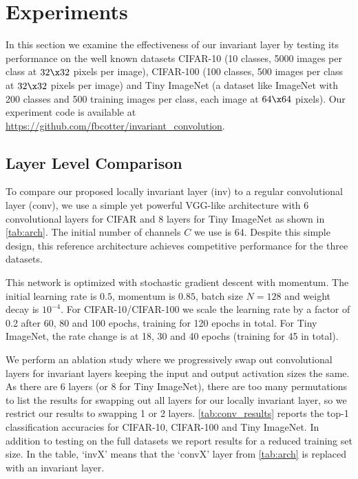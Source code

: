 \section{Experiments}\label{sec:experiments}
In this section we examine the effectiveness of our invariant layer by testing
its performance on the well known datasets CIFAR-10 (10 classes, 5000 images per class
at $32\x 32$ pixels per image), CIFAR-100 (100 classes, 500 images per class at 
$32\x 32$ pixels per image) and Tiny ImageNet\cite{li_tiny_nodate} (a dataset
like ImageNet with 200 classes and 500 training images per class, each image at
$64 \x 64$ pixels). Our experiment code is available at
\url{https://github.com/fbcotter/invariant_convolution}.

\subsection{Layer Level Comparison}\label{sec:conv_exp}
To compare our proposed locally invariant layer (inv) to a regular convolutional
layer (conv), we use a simple yet powerful VGG-like architecture with 6 convolutional layers for CIFAR
and 8 layers for Tiny ImageNet as shown in \autoref{tab:arch}. The initial number of
channels $C$ we use is 64. Despite this simple design, this reference
architecture achieves competitive performance for the three datasets.

This network is optimized with stochastic gradient descent with momentum. The
initial learning rate is $0.5$, momentum is $0.85$, batch size $N=128$ and
weight decay is $10^{-4}$. For CIFAR-10/CIFAR-100 we scale the learning rate by
a factor of 0.2 after 60, 80 and 100 epochs, training for 120 epochs in total.
For Tiny ImageNet, the rate change is at 18, 30 and 40 epochs (training for 45 in total).



We perform an ablation study where we progressively swap out convolutional
layers for invariant layers keeping the input and output activation sizes the
same. As there are 6 layers (or 8 for Tiny ImageNet), there are too many
permutations to list the results for swapping out all layers for our locally
invariant layer, so we restrict our results to swapping 1 or 2 layers. 
\autoref{tab:conv_results} reports the top-1 classification accuracies for
CIFAR-10, CIFAR-100 and Tiny ImageNet. In addition to testing on the full
datasets we report results for a reduced training set size. In the table, `invX'
means that the `convX' layer from \autoref{tab:arch} is replaced with an 
invariant layer.

